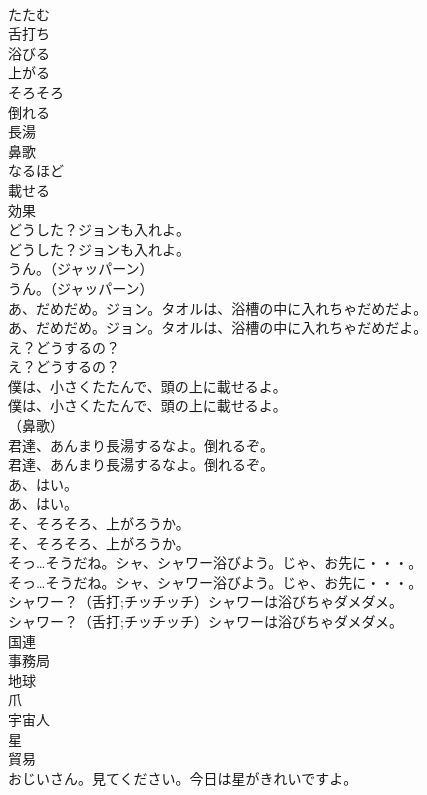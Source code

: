 \documentclass[8pt]{extreport}
\begin{document}
\begin{CJK}{UTF8}{min}
\\	たたむ
\\	舌打ち
\\	浴びる
\\	上がる
\\	そろそろ
\\	倒れる
\\	長湯
\\	鼻歌
\\	なるほど
\\	載せる
\\	効果
\\	どうした？ジョンも入れよ。	
\\	どうした？ジョンも入れよ。 
\\	うん。（ジャッパーン）	
\\	うん。（ジャッパーン） 
\\	あ、だめだめ。ジョン。タオルは、浴槽の中に入れちゃだめだよ。	
\\	あ、だめだめ。ジョン。タオルは、浴槽の中に入れちゃだめだよ。 
\\	え？どうするの？	
\\	え？どうするの？ 
\\	僕は、小さくたたんで、頭の上に載せるよ。	
\\	僕は、小さくたたんで、頭の上に載せるよ。 
\\	（鼻歌）	
\\	君達、あんまり長湯するなよ。倒れるぞ。	
\\	君達、あんまり長湯するなよ。倒れるぞ。 
\\	あ、はい。	
\\	あ、はい。 
\\	そ、そろそろ、上がろうか。	
\\	そ、そろそろ、上がろうか。 
\\	そっ…そうだね。シャ、シャワー浴びよう。じゃ、お先に・・・。	
\\	そっ…そうだね。シャ、シャワー浴びよう。じゃ、お先に・・・。 
\\	シャワー？（舌打;チッチッチ）シャワーは浴びちゃダメダメ。	
\\	シャワー？（舌打;チッチッチ）シャワーは浴びちゃダメダメ。 
\\	国連
\\	事務局
\\	地球
\\	爪
\\	宇宙人
\\	星
\\	貿易
\\	おじいさん。見てください。今日は星がきれいですよ。	

\end{CJK}
\end{document}
